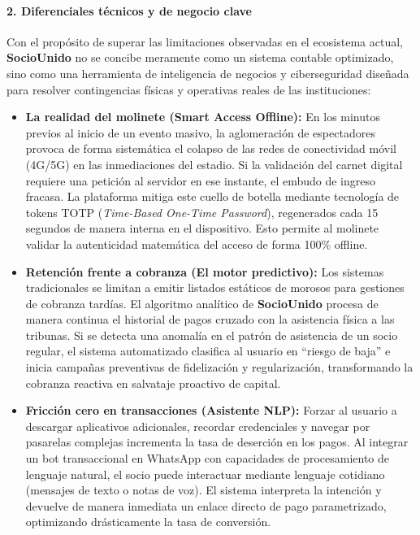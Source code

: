 \paragraph{2. Diferenciales técnicos y de negocio clave}

Con el propósito de superar las limitaciones observadas en el ecosistema actual, \textbf{SocioUnido} no se concibe meramente como un sistema contable optimizado, sino como una herramienta de inteligencia de negocios y ciberseguridad diseñada para resolver contingencias físicas y operativas reales de las instituciones:

\begin{itemize}
    \item \textbf{La realidad del molinete (Smart Access Offline):} En los minutos previos al inicio de un evento masivo, la aglomeración de espectadores provoca de forma sistemática el colapso de las redes de conectividad móvil (4G/5G) en las inmediaciones del estadio. Si la validación del carnet digital requiere una petición al servidor en ese instante, el embudo de ingreso fracasa. La plataforma mitiga este cuello de botella mediante tecnología de tokens TOTP (\textit{Time-Based One-Time Password}), regenerados cada 15 segundos de manera interna en el dispositivo. Esto permite al molinete validar la autenticidad matemática del acceso de forma 100\% offline.
    \newpage
    \item \textbf{Retención frente a cobranza (El motor predictivo):} Los sistemas tradicionales se limitan a emitir listados estáticos de morosos para gestiones de cobranza tardías. El algoritmo analítico de \textbf{SocioUnido} procesa de manera continua el historial de pagos cruzado con la asistencia física a las tribunas. Si se detecta una anomalía en el patrón de asistencia de un socio regular, el sistema automatizado clasifica al usuario en ``riesgo de baja'' e inicia campañas preventivas de fidelización y regularización, transformando la cobranza reactiva en salvataje proactivo de capital.
    \item \textbf{Fricción cero en transacciones (Asistente NLP):} Forzar al usuario a descargar aplicativos adicionales, recordar credenciales y navegar por pasarelas complejas incrementa la tasa de deserción en los pagos. Al integrar un bot transaccional en WhatsApp con capacidades de procesamiento de lenguaje natural, el socio puede interactuar mediante lenguaje cotidiano (mensajes de texto o notas de voz). El sistema interpreta la intención y devuelve de manera inmediata un enlace directo de pago parametrizado, optimizando drásticamente la tasa de conversión.
\end{itemize}

